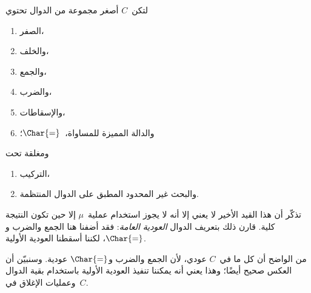 \documentclass[../../../include/open-logic-section]{subfiles}
\begin{document}

لتكن~$C$ أصغر مجموعة من الدوال تحتوي
\begin{enumerate}
\item الصفر،
\item والخلف،
\item والجمع،
\item والضرب،
\item والإسقاطات،
\item والدالة المميزة للمساواة،~$\Char{=}$؛
\end{enumerate}
ومغلقة تحت
\begin{enumerate}
\item التركيب،
\item والبحث غير المحدود المطبق على الدوال المنتظمة.
\end{enumerate}
تذكّر أن هذا القيد الأخير لا يعني إلا أنه لا يجوز استخدام عملية~$\mu$
إلا حين تكون النتيجة كلية. قارن ذلك بتعريف الدوال
\emph{العودية العامة}: فقد أضفنا هنا الجمع والضرب و$\Char{=}$، لكننا
أسقطنا العودية الأولية.

من الواضح أن كل ما في~$C$ عودي، لأن الجمع والضرب و$\Char{=}$ عودية.
وسنبيّن أن العكس صحيح أيضًا؛ وهذا يعني أنه يمكننا تنفيذ العودية
الأولية باستخدام بقية الدوال وعمليات الإغلاق في~$C$.
\end{document}
